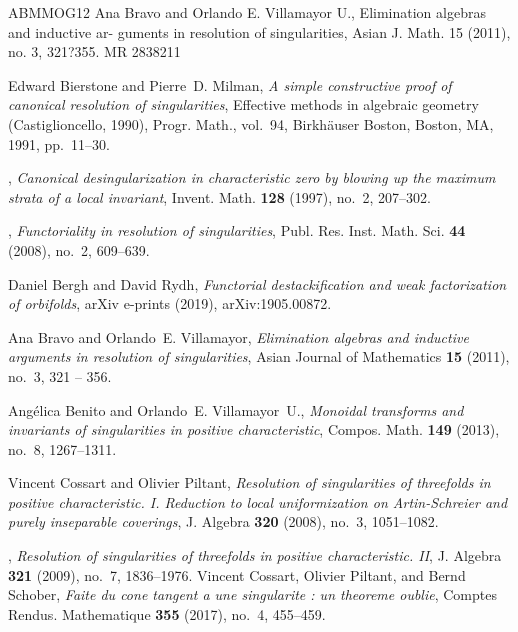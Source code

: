 \documentclass{amsart}
\begin{document}
\begin{thebibliography}{ABMMOG12}
 Ana Bravo and Orlando E. Villamayor U., Elimination algebras and inductive ar-
guments in resolution of singularities, Asian J. Math. 15 (2011), no. 3, 321?355.
MR 2838211

Edward Bierstone and Pierre~D. Milman, \emph{A simple constructive proof of
  canonical resolution of singularities}, Effective methods in algebraic
  geometry ({C}astiglioncello, 1990), Progr. Math., vol.~94, Birkh\"auser
  Boston, Boston, MA, 1991, pp.~11--30. 

\bysame, \emph{Canonical desingularization in characteristic zero by blowing up
  the maximum strata of a local invariant}, Invent. Math. \textbf{128} (1997),
  no.~2, 207--302. 

\bysame, \emph{Functoriality in resolution of singularities}, Publ. Res. Inst.
  Math. Sci. \textbf{44} (2008), no.~2, 609--639. 

Daniel {Bergh} and David {Rydh}, \emph{{Functorial destackification and weak
  factorization of orbifolds}}, arXiv e-prints (2019), arXiv:1905.00872.

Ana Bravo and Orlando~E. Villamayor, \emph{{Elimination algebras and inductive
  arguments in resolution of singularities}}, Asian Journal of Mathematics
  \textbf{15} (2011), no.~3, 321 -- 356.

Ang\'{e}lica Benito and Orlando~E. Villamayor~U., \emph{Monoidal transforms and
  invariants of singularities in positive characteristic}, Compos. Math.
  \textbf{149} (2013), no.~8, 1267--1311. 

Vincent Cossart and Olivier Piltant, \emph{Resolution of singularities of
  threefolds in positive characteristic. {I}. {R}eduction to local
  uniformization on {A}rtin-{S}chreier and purely inseparable coverings}, J.
  Algebra \textbf{320} (2008), no.~3, 1051--1082. 

\bysame, \emph{Resolution of singularities of threefolds in positive
  characteristic. {II}}, J. Algebra \textbf{321} (2009), no.~7, 1836--1976.
Vincent Cossart, Olivier Piltant, and Bernd Schober,
\emph{Faite du cone tangent a une singularite : un theoreme oublie},
Comptes Rendus. Mathematique \textbf{355} (2017), no.~4, 455--459.


\end{thebibliography}
\end{document}
